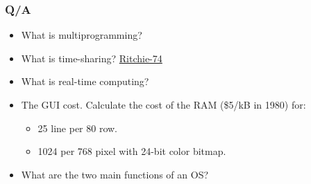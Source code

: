   \begin{frame}
    \frametitle{Q/A}
    \begin{itemize}
      \item What is multiprogramming? %
      \item What is time-sharing? \color{blue}\href{http://www.cs.berkeley.edu/~brewer/cs262/unix.pdf}{Ritchie-74} \color{black}
      \item What is real-time computing?
      \item The GUI cost. Calculate the cost of the RAM (\$5/kB in 1980) for:
      \begin{itemize}
        \item 25 line per 80 row. %
        \item 1024 per 768 pixel with 24-bit color bitmap. %
      \end{itemize}
      \item What are the two main functions of an OS? %
    \end{itemize}
  \end{frame}
